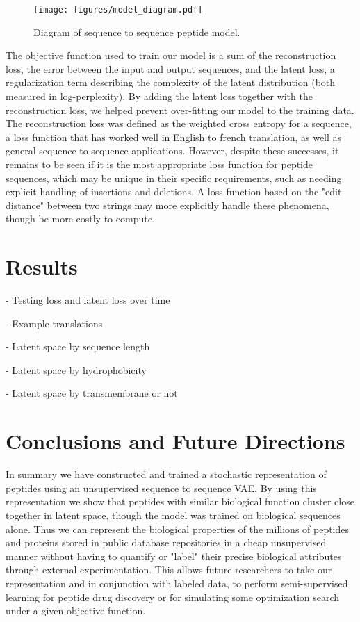 \documentclass[preprint,12pt]{elsarticle}
\begin{document}
\begin{figure}
  \centering
  \texttt{[image: figures/model\_diagram.pdf]}
  \caption{Diagram of sequence to sequence peptide model.}
  \label{model_diagram}
\end{figure}

The objective function used to train our model is a sum of the reconstruction loss, the error between the input and output sequences, and the latent loss, a regularization term describing the complexity of the latent distribution (both measured in log-perplexity). By adding the latent loss together with the reconstruction loss, we helped prevent over-fitting our model to the training data. The reconstruction loss was defined as the weighted cross entropy for a sequence, a loss function that has worked well in English to french translation, as well as general sequence to sequence applications\cite{vinyals2015grammar}. However, despite these successes, it remains to be seen if it is the most appropriate loss function for peptide sequences, which may be unique in their specific requirements, such as needing explicit handling of insertions and deletions. A loss function based on the "edit distance" between two strings may more explicitly handle these phenomena, though be more costly to compute.

\section{Results}

- Testing loss and latent loss over time

- Example translations

- Latent space by sequence length

- Latent space by hydrophobicity

- Latent space by transmembrane or not

\section{Conclusions and Future Directions}

In summary we have constructed and trained a stochastic representation of peptides using an unsupervised sequence to sequence VAE. By using this representation we show that peptides with similar biological function cluster close together in latent space, though the model was trained on biological sequences alone. Thus we can represent the biological properties of the millions of peptides and proteins stored in public database repositories in a cheap unsupervised manner without having to quantify or "label" their precise biological attributes through external experimentation. This allows future researchers to take our representation and in conjunction with labeled data, to perform semi-supervised learning for peptide drug discovery or for simulating some optimization search under a given objective function.
\end{document}
